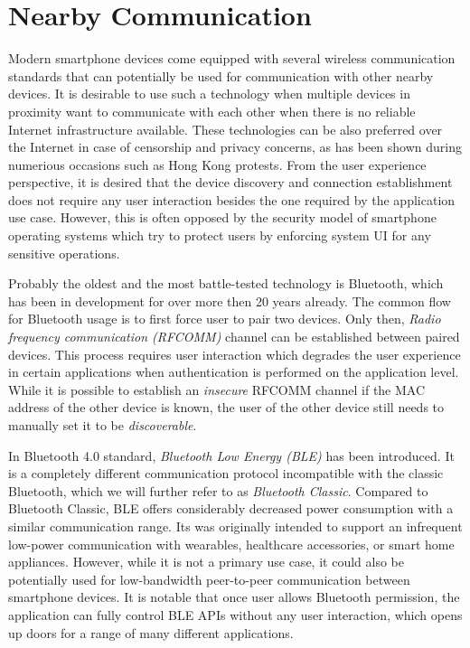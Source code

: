 
\section{Nearby Communication}

Modern smartphone devices come equipped with several wireless communication standards that can potentially be used for communication with other nearby devices. It is desirable to use such a technology when multiple devices in proximity want to communicate with each other when there is no reliable Internet infrastructure available. These technologies can be also preferred over the Internet in case of censorship and privacy concerns, as has been shown during numerious occasions such as Hong Kong protests. From the user experience perspective, it is desired that the device discovery and connection establishment does not require any user interaction besides the one required by the application use case. However, this is often opposed by the security model of smartphone operating systems which try to protect users by enforcing system UI for any sensitive operations.

Probably the oldest and the most battle-tested technology is Bluetooth, which has been in development for over more then 20 years already. The common flow for Bluetooth usage is to first force user to pair two devices. Only then, \textit{Radio frequency communication (RFCOMM)} channel can be established between paired devices. This process requires user interaction which degrades the user experience in certain applications when authentication is performed on the application level. While it is possible to establish an \textit{insecure} RFCOMM channel if the MAC address of the other device is known, the user of the other device still needs to manually set it to be \textit{discoverable}.

In Bluetooth 4.0 standard, \textit{Bluetooth Low Energy (BLE)} has been introduced. It is a completely different communication protocol incompatible with the classic Bluetooth, which we will further refer to as \textit{Bluetooth Classic}. Compared to Bluetooth Classic, BLE offers considerably decreased power consumption with a similar communication range. Its was originally intended to support an infrequent low-power communication with wearables, healthcare accessories, or smart home appliances. However, while it is not a primary use case, it could also be potentially used for low-bandwidth peer-to-peer communication between smartphone devices. It is notable that once user allows Bluetooth permission, the application can fully control BLE APIs without any user interaction, which opens up doors for a range of many different applications.

